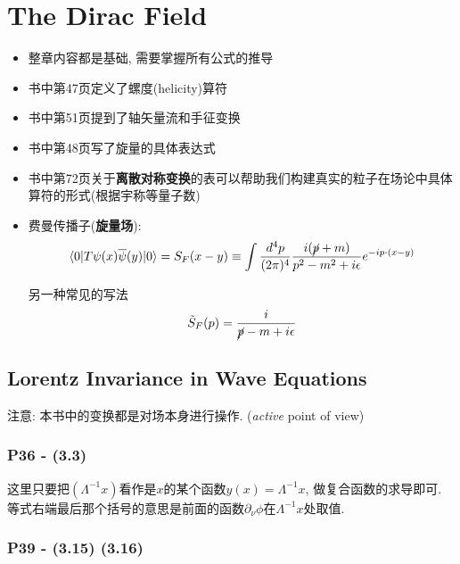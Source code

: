 \chapter{The Dirac Field}

\begin{itemize}
  \item \textbf{}整章内容都是基础, 需要掌握所有公式的推导
  \item \textbf{}书中第47页定义了螺度(helicity)算符
  \item \textbf{}书中第51页提到了轴矢量流和手征变换
  \item \textbf{}书中第48页写了旋量的具体表达式
  \item \textbf{}书中第72页关于\textbf{离散对称变换}的表可以帮助我们构建真实的粒子在场论中具体算符的形式(根据宇称等量子数)
  \item \textbf{}费曼传播子(\textbf{旋量场}):
        \begin{equation*}
          \langle 0|T\psi(x)\overline{\psi}(y)|0 \rangle = S_F(x-y)\equiv \int \frac{d^4 p}{(2\pi)^4} \frac{i(\cancel{p} + m)}{p^2 - m^2 +i\epsilon} e^{-ip\cdot (x-y)}
        \end{equation*}
        \begin{mybox}{另一种常见的写法}
          \begin{equation*}
            \tilde{S}_F(p) = \frac{i}{\cancel{p} - m +i\epsilon}
          \end{equation*}
        \end{mybox}
\end{itemize}
\pagestyle{general}

\section{Lorentz Invariance in Wave Equations}

注意: 本书中的变换都是对场本身进行操作. (\textit{active} point of view)

\subsection{P36 - (3.3)}

这里只要把$(\Lambda^{-1}x)$看作是$x$的某个函数$y(x) = \Lambda^{-1}x$, 做复合函数的求导即可.
等式右端最后那个括号的意思是前面的函数$\partial_{\nu}\phi$在$\Lambda^{-1}x$处取值.

\subsection{P39 - (3.15) (3.16)}

